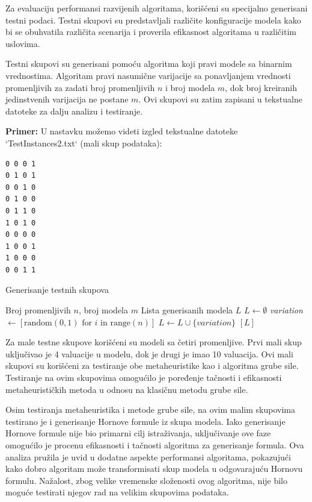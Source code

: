 \documentclass[12pt,oneside]{memoir}
\begin{document}
Za evaluaciju performansi razvijenih algoritama, korišćeni su specijalno generisani testni podaci. Testni skupovi su predstavljali različite konfiguracije modela kako bi se obuhvatila različita scenarija i proverila efikasnost algoritama u različitim uslovima. 

Testni skupovi su generisani pomoću algoritma koji pravi modele sa binarnim vrednostima. Algoritam pravi nasumične varijacije sa ponavljanjem vrednosti promenljivih za zadati broj promenljivih $n$ i broj modela $m$, dok broj kreiranih jedinstvenih varijacija ne postane $m$. Ovi skupovi su zatim zapisani u tekstualne datoteke za dalju analizu i testiranje.

\textbf{Primer:} U nastavku možemo videti izgled tekstualne datoteke `TestInstances2.txt` (mali skup podataka):

\begin{lstlisting}[basicstyle=\ttfamily, frame=single]
0 0 0 1
0 1 0 1
0 0 1 0
0 1 0 0
0 1 1 0
1 0 1 0
0 0 0 0
1 0 0 1
1 0 0 0
0 0 1 1
\end{lstlisting}

\begin{algorithm}[H]
\caption{Generisanje testnih skupova}
\renewcommand{\algorithmicrequire}{\textbf{Ulaz:}}
\renewcommand{\algorithmicensure}{\textbf{Izlaz:}}
\begin{algorithmic}[1]
\REQUIRE Broj promenljivih $n$, broj modela $m$
\ENSURE Lista generisanih modela $L$ 
\STATE $L \gets \emptyset$
    \STATE \textit{variation} $\gets [\text{random}(0, 1) \text{ for } i \text{ in } \text{range}(n)]$
    \STATE $L \gets L \cup \{variation\}$
\ENDWHILE
\RETURN $[L]$
\end{algorithmic}
\end{algorithm}

Za male testne skupove korišćeni su modeli sa četiri promenljive. Prvi mali skup uključivao je 4 valuacije u modelu, dok je drugi je imao 10 valuacija. Ovi mali skupovi su korišćeni za testiranje obe metaheuristike kao i algoritma grube sile. Testiranje na ovim skupovima omogućilo je poređenje tačnosti i efikasnosti metaheurističkih metoda u odnosu na klasičnu metodu grube sile. 

Osim testiranja metaheuristika i metode grube sile, na ovim malim skupovima testirano je i generisanje Hornove formule iz skupa modela. Iako generisanje Hornove formule nije bio primarni cilj istraživanja, uključivanje ove faze omogućilo je procenu efikasnosti i tačnosti algoritma za generisanje formula. Ova analiza pružila je uvid u dodatne aspekte performansi algoritama, pokazujući kako dobro algoritam može transformisati skup modela u odgovarajuću Hornovu formulu. Nažalost, zbog velike vremenske složenosti ovog algoritma, nije bilo moguće testirati njegov rad na velikim skupovima podataka.
\end{document}
